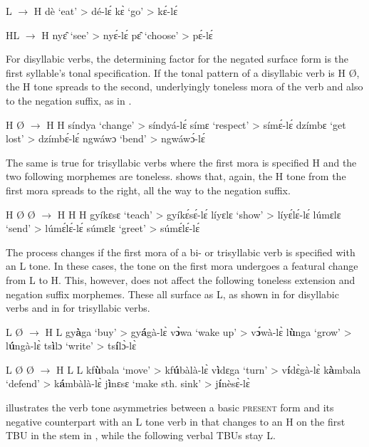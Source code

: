 \ea\label{leL} L $\rightarrow$ H
\ea  dè `eat' > dé-lɛ́
\ex  kɛ̀ `go' > kɛ́-lɛ́ 
\z
\z

\ea\label{leHL} HL $\rightarrow$ H
\ea  nyɛ̂ `see' > nyɛ́-lɛ́
\ex pɛ̂ `choose' > pɛ́-lɛ́
\z
\z

For disyllabic verbs, the determining factor for the negated surface form is the first syllable's tonal specification. If the tonal pattern of a disyllabic verb is H {\O}, the H tone spreads to the second, underlyingly toneless mora of the verb and also to the negation suffix, as in .

\ea\label{leHLbi} H {\O} $\rightarrow$ H H
\ea  síndya `change' > síndyá-lɛ́
\ex símɛ  `respect' > símɛ́-lɛ́
\ex dzímbɛ `get lost'  > dzímbɛ́-lɛ́ 
\ex  ngwáwɔ `bend' > ngwáwɔ́-lɛ́
\z
\z

\noindent The same is true for trisyllabic verbs where the first mora is specified H and the two following morphemes are toneless.  shows that, again, the H tone from the first mora spreads to the right, all the way to the negation suffix.

\ea\label{leHLL} H {\O} {\O} $\rightarrow$ H H H
\ea  gyíkɛsɛ `teach' > gyíkɛ́sɛ́-lɛ́
\ex  líyɛlɛ  `show' > líyɛ́lɛ́-lɛ́
\ex lúmɛlɛ `send' >  lúmɛ́lɛ́-lɛ́
\ex  súmɛlɛ `greet' > súmɛ́lɛ́-lɛ́
\z
\z

The process changes if the first mora of a bi- or trisyllabic verb is specified with an L tone. In these cases, the tone on the first mora undergoes a featural change from L to H. This, however, does not affect the following toneless extension and negation suffix morphemes. These all surface as L, as shown in  for disyllabic verbs and in  for trisyllabic verbs.

\ea\label{leLL} L {\O} $\rightarrow$ H L
\ea  gy{\bfseries à}ga `buy' > gy{\bfseries á}gà-lɛ̀
\ex  v{\bfseries ɔ̀}wa  `wake up' > v{\bfseries ɔ́}wà-lɛ̀
\ex l{\bfseries ù}nga `grow'  > l{\bfseries ú}ngà-lɛ̀
\ex ts{\bfseries ì}lɔ `write' >  ts{\bfseries í}lɔ̀-lɛ̀
\z
\z


\ea\label{leLLL} L {\O} {\O} $\rightarrow$ H L L
\ea  kf{\bfseries ù}bala `move' > kf{\bfseries ú}bàlà-lɛ̀
\ex  v{\bfseries ì}dɛga  `turn' > v{\bfseries í}dɛ̀gà-lɛ̀
\ex k{\bfseries à}mbala `defend' > k{\bfseries á}mbàlà-lɛ̀
\ex j{\bfseries ì}nɛsɛ `make sth. sink' >  j{\bfseries í}nèsɛ̀-lɛ̀
\z
\z

 illustrates the verb tone asymmetries between a basic \textsc{present} form and its negative counterpart with an L tone verb in  that changes to an H on the first TBU in the stem in , while the following verbal TBUs stay L.

